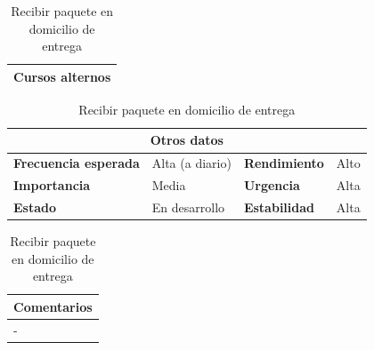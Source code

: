 \documentclass[12pt,spanish]{article}
\begin{document}
\begin{table}[H]
\vspace{1cm}

\begin{tabular}{|m{10pt}|m{7.15cm}|m{10pt}|m{7.15cm}|}
\hline
\multicolumn{4}{|m{16.2cm}|}{\textbf{Cursos alternos}} \\
\hline
\end{tabular}

\vspace{1cm}

\begin{tabular}{|m{3.72cm}|m{3.72cm}|m{3.72cm}|m{3.72cm}|}
\hline
\multicolumn{4}{|c|}{\textbf{Otros datos}} \\
\hline
\textbf{Frecuencia esperada} & Alta (a diario) & \textbf{Rendimiento} & Alto \\
\hline
\textbf{Importancia} & Media & \textbf{Urgencia} & Alta \\
\hline
\textbf{Estado} & En desarrollo & \textbf{Estabilidad} & Alta \\
\hline
\end{tabular}

\vspace{1cm}

\begin{tabular}{|m{16.2cm}|}
\hline
\textbf{Comentarios} \\
\hline
- \\
\hline
\end{tabular}

\caption{Recibir paquete en domicilio de entrega}

\end{table}

\end{document}
